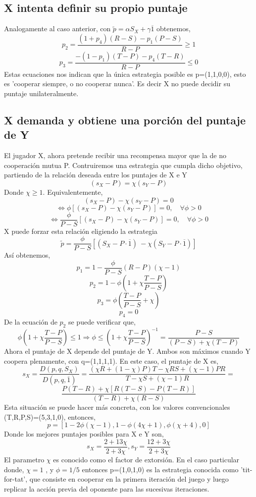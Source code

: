 \documentclass[11pt]{article}
\begin{document}
\subsection{X intenta definir su propio puntaje}
Analogamente al caso anterior, con $\tilde{p}=\alpha S_X + \gamma\overline1$  obtenemos,
$$p_2=\frac{(1+p_4)(R-S)-p_1(P-S)}{R-P}\geq 1$$
$$p_3=\frac{-(1-p_1)(T-P)-p_4(T-R)}{R-P}\leq 0$$
Estas ecuaciones nos indican que la única estrategia posible es p=(1,1,0,0), esto es 'cooperar siempre, o no cooperar nunca'. Es decir
X no puede decidir su puntaje unilateralmente.


\subsection{X demanda y obtiene una porción del puntaje de Y}
El jugador X, ahora pretende recibir una recompensa mayor que la de no cooperación mutua P.
Contruiremos una estrategia que cumpla dicho objetivo, partiendo de la relación deseada entre los puntajes de X e Y
$$(s_X -P)=\chi (s_Y-P)$$
Donde $\chi \geq 1$. Equivalentemente,
$$(s_X -P)-\chi (s_Y-P)=0$$ $$\Leftrightarrow \phi[(s_X -P)-\chi (s_Y-P)]=0, \quad \forall \phi>0$$ $$\Leftrightarrow \frac{\phi}{P-S}[(s_X -P)-\chi (s_Y-P)]=0, \quad \forall \phi>0$$
X puede forzar esta relación eligiendo la estrategia
$$\tilde{p}=\frac{\phi}{P-S}[(S_X-P\cdot\overline1)\ - \chi (S_Y-P\cdot\overline1)]$$
Así obtenemos,
$$p_1=1-\frac{\phi}{P-S}(R-P)(\chi-1)$$
$$p_2=1-\phi(1+\chi \frac{T-P}{P-S})$$
$$p_3=\phi(\frac{T-P}{P-S}+\chi )$$
$$p_4=0$$
De la ecuación de $p_2$ se puede verificar que,
$$\phi(1+\chi\frac{T-P}{P-S})\leq 1 \Rightarrow \phi\leq(1+\chi \frac{T-P}{P-S})^{-1}=\frac{P-S}{(P-S) + \chi(T-P)}$$
Ahora el puntaje de X depende del puntaje de Y. Ambos son máximos cuando Y coopera plenamente, con
q=(1,1,1,1). En este caso, el puntaje de X es,
$$s_X= \frac{D(p,q,S_X)}{D(p,q,\overline1)}=\frac{(\chi R + (1-\chi)P)T-\chi RS+(\chi-1)PR}{T-\chi S+(\chi-1)R}=$$
$$\frac{P(T-R)+\chi[R(T-S)-P(T-R)]}{(T-R)+\chi(R-S)}$$
Esta situación se puede hacer más concreta, con los valores convencionales (T,R,P,S)=(5,3,1,0), entonces,
$$p=[1-2\phi(\chi-1),1-\phi(4 \chi+1),\phi(\chi+4),0]$$
Donde los mejores puntajes posibles para X e Y son,
$$s_X=\frac{2+13\chi}{2+3\chi}, s_Y=\frac{12+3\chi}{2+3\chi}$$
El parametro $\chi$ es conocido como el factor de extorsión. En el caso particular donde, $\chi=1$ , y $\phi =1/5$
entonces p=(1,0,1,0) es la estrategia conocida como 'tit-for-tat', que consiste en cooperar en la primera 
iteración del juego y luego replicar la acción previa del oponente para las sucesivas iteraciones.
\end{document}
